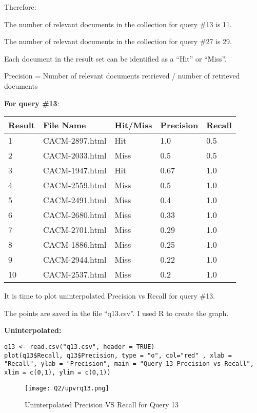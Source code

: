 Therefore:

The number of relevant documents in the collection for query \#13 is 11.

The number of relevant documents in the collection for query \#27 is 29.

Each document in the result set can be identified as a ``Hit'' or ``Miss''.

Precision = Number of relevant documents retrieved / number of retrieved documents

\textbf{For query \#13}:

\begin{longtable}{ |p{1cm}|p{4cm}|p{3cm}|p{2cm}|p{2cm}| } 
\hline
Result & File Name & Hit/Miss & Precision & Recall\\
\hline
1 & CACM-2897.html & Hit & 1.0 & 0.5 \\
\hline
2 & CACM-2033.html & Miss & 0.5 & 0.5 \\
\hline
3 & CACM-1947.html & Hit & 0.67 & 1.0 \\
\hline
4 & CACM-2559.html & Miss & 0.5 & 1.0 \\
\hline
5 & CACM-2491.html & Miss & 0.4 & 1.0 \\
\hline
6 & CACM-2680.html & Miss & 0.33 & 1.0 \\
\hline
7 & CACM-2701.html & Miss & 0.29 & 1.0 \\
\hline
8 & CACM-1886.html & Miss & 0.25 & 1.0 \\
\hline
9 & CACM-2944.html & Miss  & 0.22 & 1.0 \\
\hline
10 & CACM-2537.html & Miss & 0.2 & 1.0 \\
\hline
\end{longtable}

It is time to plot uninterpolated Precision vs Recall for query \#13.

The points are saved in the file ``q13.csv''. I used R to create the graph.

\pagebreak

\textbf{Uninterpolated:}

\begin{lstlisting}[breakatwhitespace=〈false)]
q13 <- read.csv("q13.csv", header = TRUE)
plot(q13$Recall, q13$Precision, type = "o", col="red" , xlab = "Recall", ylab = "Precision", main = "Query 13 Precision vs Recall", xlim = c(0,1), ylim = c(0,1))
\end{lstlisting}

\begin{figure}[h]
\caption{Uninterpolated Precision VS Recall for Query 13}
\centering
\texttt{[image: Q2/upvrq13.png]}
\end{figure}

